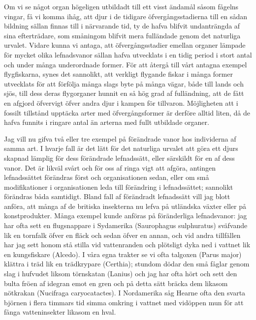 Om vi se något organ högeligen utbildadt till ett visst ändamål såsom fågelns vingar, få vi komma ihåg, att djur i de tidigare öfvergångsstadierna till en sådan bildning sällan finnas till i närvarande tid, ty de hafva blifvit undanträngda af sina efterträdare, som småningom blifvit mera fulländade genom det naturliga urvalet. Vidare kunna vi antaga, att öfvergångsstadier emellan organer lämpade för mycket olika lefnadsvanor sällan hafva utvecklats i en tidig period i stort antal och under många underordnade former. För att återgå till vårt antagna exempel flygfiskarna, synes det sannolikt, att verkligt flygande fiskar i många former utvecklats för att förfölja många slags byte på många vägar, både till lands och sjös, till dess deras flygorganer hunnit en så hög grad af fulländning, att de fått en afgjord öfvervigt öfver andra djur i kampen för tillvaron. Möjligheten att i fossilt tillstånd upptäcka arter med öfvergångsformer är derföre alltid liten, då de hafva funnits i ringare antal än arterna med fullt utbildade organer.

Jag vill nu gifva två eller tre exempel på förändrade vanor hos individerna af samma art. I hvarje fall är det lätt för det naturliga urvalet att göra ett djurs skapnad lämplig för dess förändrade lefnadssätt, eller särskildt för en af dess vanor. Det är likväl svårt och för oss af ringa vigt att afgöra, antingen lefnadssättet förändras först och organisationen sedan, eller om små modifikationer i organisationen leda till förändring i lefnadssättet; sannolikt förändras båda samtidigt. Bland fall af förändradt lefnadssätt vill jag blott anföra, att många af de britiska insekterna nu lefva på utländska växter eller på konstprodukter. Många exempel kunde anföras på föränderliga lefnadsvanor: jag har ofta sett en flugsnappare i Sydamerika (Saurophagus sulphuratus) sväfvande lik en tornfalk öfver en fläck och sedan öfver en annan, och vid andra tillfällen har jag sett honom stå stilla vid vattenranden och plötsligt dyka ned i vattnet lik en kungsfiskare (Alcedo). I våra egna trakter se vi ofta talgoxen (Parus major) klättra i träd lik en trädkrypare (Certhia); stundom dödar den små fåglar genom slag i hufvudet liksom törnskatan (Lanius) och jag har ofta hört och sett den bulta fröen af idegran emot en gren och på detta sätt bräcka dem likasom nötkrakan (Nucifraga caryocatactes). I Nordamerika såg Hearne ofta den svarta björnen i flera timmars tid simma omkring i vattnet med vidöppen mun för att fånga vatteninsekter likasom en hval.


